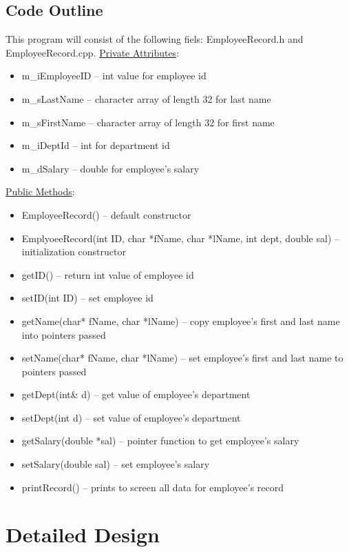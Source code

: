 \documentclass[12pt]{article}%
\begin{document}
\subsection{Code Outline}
This program will consist of the following fiels: EmployeeRecord.h and EmployeeRecord.cpp.
\newline
\newline
\underline{Private Attributes}:
\begin{itemize}
    \item m\_iEmployeeID -- int value for employee id
    \item m\_sLastName -- character array of length 32 for last name
    \item m\_sFirstName -- character array of length 32 for first name
    \item m\_iDeptId -- int for department id
    \item m\_dSalary -- double for employee's salary
\end{itemize}
\newline
\newline
\underline{Public Methods}:
\newline
\begin{itemize}
    \item EmployeeRecord() -- default constructor
    \item EmplyoeeRecord(int ID, char *fName, char *lName, int dept, double sal) -- initialization constructor
    \item getID() -- return int value of employee id
    \item setID(int ID) -- set employee id
    \item getName(char* fName, char *lName) -- copy employee's first and last name into pointers passed
    \item setName(char* fName, char *lName) -- set employee's first and last name to pointers passed
    \item getDept(int\& d) -- get value of employee's department
    \item setDept(int d) -- set value of employee's department
    \item getSalary(double *sal) -- pointer function to get employee's salary
    \item setSalary(double sal) -- set employee's salary
    \item printRecord() -- prints to screen all data for employee's record
\end{itemize}

\section{Detailed Design}
\end{document}

